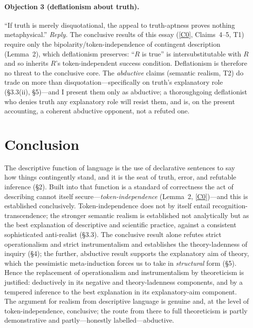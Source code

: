 \documentclass[12pt]{article}
\begin{document}
\paragraph{Objection 3 (deflationism about truth).} ``If truth is merely
disquotational, the appeal to truth-aptness proves nothing metaphysical.''
\emph{Reply.} The conclusive results of this essay (\ref{C0}, Claims~4--5,
T1) require only the bipolarity/token-independence of contingent
description (Lemma~2), which deflationism preserves: ``$R$ is true'' is
intersubstitutable with $R$ and so inherits $R$'s token-independent
success condition. Deflationism is therefore no threat to the conclusive
core. The \emph{abductive} claims (semantic realism, T2) do trade on more
than disquotation---specifically on truth's explanatory role (\S3.3(ii),
\S5)---and I present them only as abductive; a thoroughgoing deflationist
who denies truth any explanatory role will resist them, and is, on the
present accounting, a coherent abductive opponent, not a refuted one.

\section{Conclusion}

The descriptive function of language is the use of declarative sentences
to say how things contingently stand, and it is the seat of truth, error,
and refutable inference (\S2). Built into that function is a standard of
correctness the act of describing cannot itself secure---\emph{token-independence}
(Lemma~2, \ref{C0})---and this is established conclusively. Token-independence
does not by itself entail recognition-transcendence; the stronger semantic
realism is established not analytically but as the best explanation of
descriptive and scientific practice, against a consistent sophisticated
anti-realist (\S3.3). The conclusive result alone refutes strict
operationalism and strict instrumentalism and establishes the
theory-ladenness of inquiry (\S4); the further, abductive result supports
the explanatory aim of theory, which the pessimistic meta-induction forces
us to take in \emph{structural} form (\S5). Hence the replacement of
operationalism and instrumentalism by theoreticism is justified:
deductively in its negative and theory-ladenness components, and by a
tempered inference to the best explanation in its explanatory-aim
component. The argument for realism from descriptive language is genuine
and, at the level of token-independence, conclusive; the route from there
to full theoreticism is partly demonstrative and partly---honestly
labelled---abductive.
\end{document}
